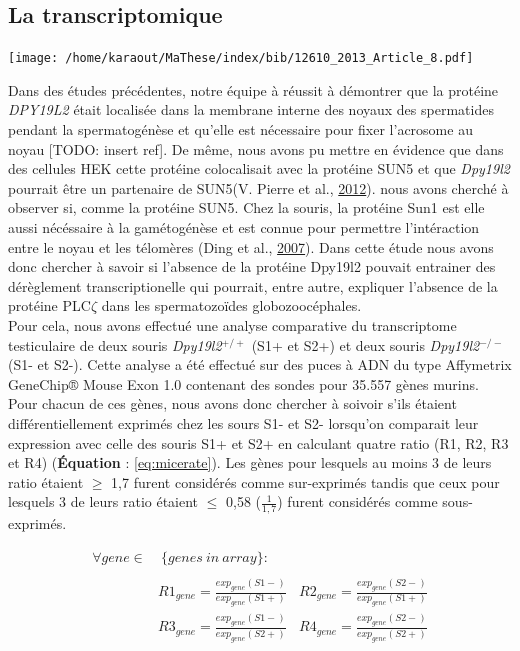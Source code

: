 \documentclass[12pt,twoside]{reedthesis}
\theoremstyle{definition}
\theoremstyle{definition}
\theoremstyle{remark}
\begin{document}
  \hypertarget{transcriptome}{\subsection{La
  transcriptomique}\label{transcriptome}}
  
  \begin{flushleft} 
  \texttt{[image: /home/karaout/MaThese/index/bib/12610\_2013\_Article\_8.pdf]}
  \newpage
  \end{flushleft}
  
  Dans des études précédentes, notre équipe à réussit à démontrer que la
  protéine \emph{DPY19L2} était localisée dans la membrane interne des
  noyaux des spermatides pendant la spermatogénèse et qu'elle est
  nécessaire pour fixer l'acrosome au noyau {[}TODO: insert ref{]}. De
  même, nous avons pu mettre en évidence que dans des cellules HEK cette
  protéine colocalisait avec la protéine SUN5 et que \emph{Dpy19l2}
  pourrait être un partenaire de SUN5(V. Pierre et al.,
  \protect\hyperlink{ref-Pierre2012}{2012}). nous avons cherché à observer
  si, comme la protéine SUN5. Chez la souris, la protéine Sun1 est elle
  aussi nécéssaire à la gamétogénèse et est connue pour permettre
  l'intéraction entre le noyau et les télomères (Ding et al.,
  \protect\hyperlink{ref-Ding2007}{2007}). Dans cette étude nous avons
  donc chercher à savoir si l'absence de la protéine Dpy19l2 pouvait
  entrainer des dérèglement transcriptionelle qui pourrait, entre autre,
  expliquer l'absence de la protéine PLC\(\zeta\) dans les spermatozoïdes
  globozoocéphales.\\
  Pour cela, nous avons effectué une analyse comparative du transcriptome
  testiculaire de deux souris \emph{Dpy19l2}\(^{+/+}\) (S1+ et S2+) et
  deux souris \emph{Dpy19l2}\(^{-/-}\) (S1- et S2-). Cette analyse a été
  effectué sur des puces à ADN du type Affymetrix GeneChip® Mouse Exon 1.0
  contenant des sondes pour 35.557 gènes murins. Pour chacun de ces gènes,
  nous avons donc chercher à soivoir s'ils étaient différentiellement
  exprimés chez les sours S1- et S2- lorsqu'on comparait leur expression
  avec celle des souris S1+ et S2+ en calculant quatre ratio (R1, R2, R3
  et R4) (\textbf{Équation} : \eqref{eq:micerate}). Les gènes pour lesquels
  au moins 3 de leurs ratio étaient \(\ge\) 1,7 furent considérés comme
  sur-exprimés tandis que ceux pour lesquels 3 de leurs ratio étaient
  \(\le\) 0,58 (\(\frac{1}{1,7}\)) furent considérés comme sous-exprimés.
  
  \begin{equation} 
  \begin{split}
  \forall gene \in & \ \{genes\ in\ array\}: \\
  \\
  & R1_{gene} = \frac{exp_{gene}(S1-)}{exp_{gene}(S1+)} \ \ \ \ R2_{gene} = \frac{exp_{gene}(S2-)}{exp_{gene}(S1+)} \\
  & R3_{gene} = \frac{exp_{gene}(S1-)}{exp_{gene}(S2+)} \ \ \ \ R4_{gene} = \frac{exp_{gene}(S2-)}{exp_{gene}(S2+)} 
  \label{eq:micerate}
  \end{split}
  \end{equation}
  
\end{document}
